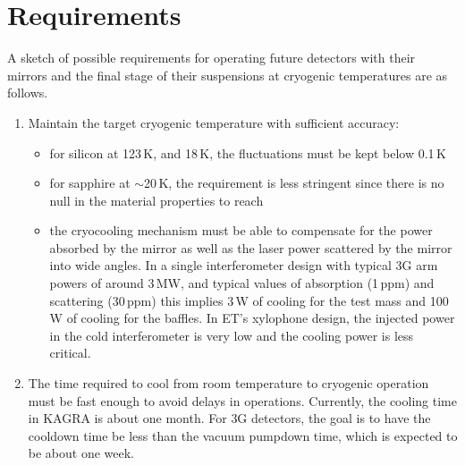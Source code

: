 \section{Requirements}
A sketch of possible requirements for operating future detectors with their mirrors and the final stage of their suspensions at cryogenic temperatures are as follows. 
\begin{enumerate}
\item Maintain the target cryogenic temperature with sufficient accuracy:
      \begin{itemize}
        \item for silicon at 123\,K, and 18\,K, the fluctuations must be kept below 0.1\,K
        \item for sapphire at $\sim$20\,K, the requirement is less stringent since there is no null in the material properties to reach
        \item the cryocooling mechanism must be able to compensate for the power absorbed by the mirror as well as the laser power scattered by the mirror into wide angles. In a single interferometer design with typical \ac{3G} arm powers of around 3\,MW, and typical values of absorption (1\,ppm) and scattering (30\,ppm) this implies 3\,W of cooling for the test mass and 100\,W of cooling for the baffles. In ET's xylophone design, the injected power in the cold interferometer is very low and the cooling power is less critical. 
      \end{itemize}

\item The time required to cool from room temperature to cryogenic operation must be fast enough to avoid delays in operations. Currently, the cooling time in \ac{KAGRA} is about one month. For \ac{3G} detectors, the goal is to have the cooldown time be less than the vacuum pumpdown time, which is expected to be about one week.  



\end{enumerate}
